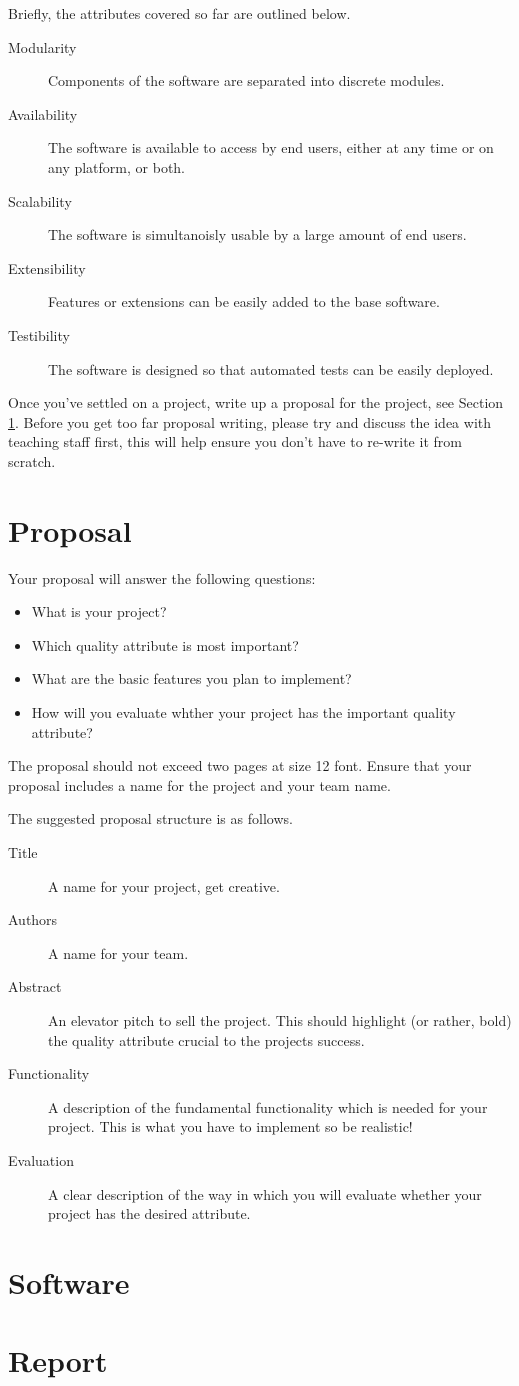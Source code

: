 \documentclass{csse4400}
\begin{document}
Briefly, the attributes covered so far are outlined below.
\begin{description}
    \item[Modularity] Components of the software are separated into discrete modules.
    \item[Availability] The software is available to access by end users, either at any time or on any platform, or both.
    \item[Scalability] The software is simultanoisly usable by a large amount of end users.
    \item[Extensibility] Features or extensions can be easily added to the base software.
    \item[Testibility] The software is designed so that automated tests can be easily deployed.
\end{description}

\noindent
Once you've settled on a project, write up a proposal for the project, see Section \ref{sect:proposal}.
Before you get too far proposal writing,
please try and discuss the idea with teaching staff first,
this will help ensure you don't have to re-write it from scratch.


\section{Proposal}\label{sect:proposal}
Your proposal will answer the following questions:
\begin{itemize}
    \item What is your project?
    \item Which quality attribute is most important?
    \item What are the basic features you plan to implement?
    \item How will you evaluate whther your project has the important quality attribute?
\end{itemize}

The proposal should not exceed two pages at size 12 font.
Ensure that your proposal includes a name for the project and your team name.

The suggested proposal structure is as follows.
\begin{description}
    \item[Title] A name for your project, get creative.
    \item[Authors] A name for your team.
    \item[Abstract] An elevator pitch to sell the project. This should highlight (or rather, bold) the quality attribute crucial to the projects success.
    \item[Functionality] A description of the fundamental functionality which is needed for your project. This is what you have to implement so be realistic!
    \item[Evaluation] A clear description of the way in which you will evaluate whether your project has the desired attribute.
\end{description}

\section{Software}

\section{Report}
\end{document}
